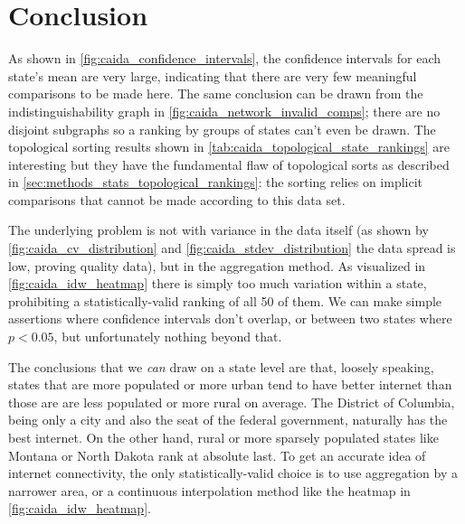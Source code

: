 \section{Conclusion}

As shown in \cref{fig:caida_confidence_intervals}, the confidence intervals for each state's mean are very large, indicating that there are very few meaningful comparisons to be made here. The same conclusion can be drawn from the indistinguishability graph in \cref{fig:caida_network_invalid_comps}; there are no disjoint subgraphs so a ranking by groups of states can't even be drawn. The topological sorting results shown in \cref{tab:caida_topological_state_rankings} are interesting but they have the fundamental flaw of topological sorts as described in \cref{sec:methods_stats_topological_rankings}: the sorting relies on implicit comparisons that cannot be made according to this data set.

The underlying problem is not with variance in the data itself (as shown by \cref{fig:caida_cv_distribution} and \cref{fig:caida_stdev_distribution} the data spread is low, proving quality data), but in the aggregation method. As visualized in \cref{fig:caida_idw_heatmap} there is simply too much variation within a state, prohibiting a statistically-valid ranking of all 50 of them. We can make simple assertions where confidence intervals don't overlap, or between two states where $p<0.05$, but unfortunately nothing beyond that.

The conclusions that we \textit{can} draw on a state level are that, loosely speaking, states that are more populated or more urban tend to have better internet than those are are less populated or more rural on average. The District of Columbia, being only a city and also the seat of the \us federal government, naturally has the best internet. On the other hand, rural or more sparsely populated states like Montana or North Dakota rank at absolute last. To get an accurate idea of internet connectivity, the only statistically-valid choice is to use aggregation by a narrower area, or a continuous interpolation method like the \idw heatmap in \cref{fig:caida_idw_heatmap}.
